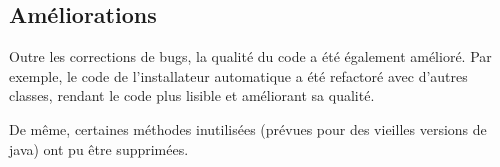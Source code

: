 \subsection{Améliorations}
Outre les corrections de bugs, la qualité du code a été également amélioré.
Par exemple, le code de l'installateur automatique a été refactoré avec d'autres classes, rendant le code plus lisible et améliorant sa qualité.

De même, certaines méthodes inutilisées (prévues pour des vieilles versions de java) ont pu être supprimées.